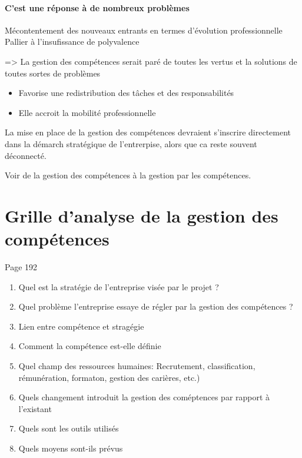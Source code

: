 \paragraph{C'est une réponse à de nombreux problèmes}
Mécontentement des nouveaux entrants en termes d'évolution professionnelle
Pallier à l'insufissance de polyvalence

=> La gestion des compétences serait paré de toutes les vertus et la solutions de toutes sortes de problèmes

\begin{itemize}
    \item Favorise une redistribution des tâches et des responsabilités
    \item Elle accroit la mobilité professionnelle
\end{itemize}




La mise en place de la gestion des compétences devraient s'inscrire directement dans la démarch stratégique de l'entrerpise, alors que ca reste souvent déconnecté. 

Voir de la gestion des compétences à la gestion par les compétences. 


\section{Grille d'analyse de la gestion des compétences}

Page 192
\begin{enumerate}
    \item Quel est la stratégie de l'entreprise visée par le projet ?
    \item Quel problème l'entreprise essaye de régler par la gestion des compétences ?
    \item Lien entre compétence et stragégie 
    \item Comment la compétence est-elle définie
    \item Quel champ des ressources humaines: Recrutement, classification, rémunération, formaton, gestion des carières, etc.)
    \item Quels changement introduit la gestion des coméptences par rapport à l'existant
    \item Quels sont les outils utilisés
    \item Quels moyens sont-ils prévus  
\end{enumerate}


